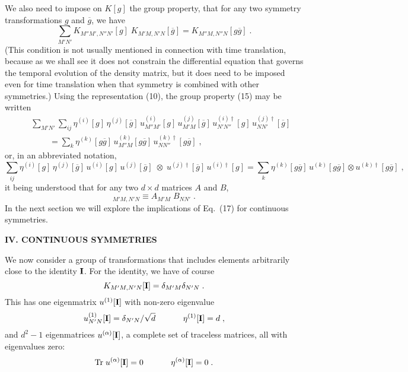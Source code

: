\documentclass[12pt]{article}
\begin{document}
We also need to impose on $K[g]$ the group property, that for any two symmetry transformations $g$ and $\overline{g}$, we have
\begin{equation}
\sum_{M'N'}K_{M''M',N''N'}[g]\;K_{M'M,N'N}[\overline{g}]=K_{M''M,N''N}[g\overline{g}]\;.
\end{equation}
(This condition is not usually mentioned in connection with time translation, because as we shall see it does not constrain the differential equation that governs the temporal evolution of the density matrix, but it does need to be imposed even for time translation when that symmetry is combined with other symmetries.)
Using the representation (10), the group property (15) may be written
\begin{eqnarray}
&&\sum_{M'N'}\sum_{ij}\eta^{(i)}[g]\,\eta^{(j)}[\overline{g}]\,u^{(i)}_{M''M'}[g]\,u^{(j)}_{M'M}[\overline{g}]\,u^{(i)\dagger}_{N'N''}[g]\,u^{(j)\dagger}_{NN'}[\overline{g}]\nonumber\\&&
~~~~~~~~~~=\sum_k \eta^{(k)}[g\overline{g}]\,u^{(k)}_{M''M}[g\overline{g}]\,u^{(k)\dagger}_{NN''}[g\overline{g}]\;,
\end{eqnarray}
or, in an abbreviated notation,
\begin{equation}
\sum_{ij}\eta^{(i)}[g]\,\eta^{(j)}[\overline{g}]\,u^{(i)}[g]\,u^{(j)}[\overline{g}]\;\otimes\; u^{(j)\dagger}[\overline{g}]\,u^{(i)\dagger}[g]
=\sum_k \eta^{(k)}[g\overline{g}]\,u^{(k)}[g\overline{g}]\otimes u^{(k)\dagger}[g\overline{g}]\;,
\end{equation}
it being understood that for any two $d\times d$ matrices $A$ and $B$, 
\begin{equation}
[A\otimes B]_{M'M,N'N}\equiv A_{M'M}\;B_{NN'}\;.
\end{equation}
In the next section we will explore the implications of Eq.~(17) for continuous symmetries.

\vspace{20pt}

\begin{center}
{\bf IV. CONTINUOUS SYMMETRIES}
\end{center}

We now consider a group of transformations that includes elements arbitrarily close to the identity ${\bf I}$.    For the identity, we have of course
\begin{equation}
K_{M'M,N'N}[{\bf I}]=\delta_{M'M}\delta_{N'N}\;.
\end{equation}
This has one eigenmatrix $u^{(1)}[{\bf I}]$ with non-zero eigenvalue
\begin{equation}
u^{(1)}_{N'N}[{\bf I}]=\delta_{N'N}/\sqrt{d}~~~~~~~~~~\eta^{(1)}[{\bf I}]=d\;,
\end{equation}
and $ d^2-1$ eigenmatrices $u^{(\alpha)}[{\bf I}]$, a complete set of traceless matrices, all  with  eigenvalues zero:
\begin{equation}
{\rm Tr}\; u^{(\alpha)}[{\bf I}]=0~~~~~~~~~~\eta^{(\alpha)}[{\bf I}]=0\;.
\end{equation}
\end{document}
